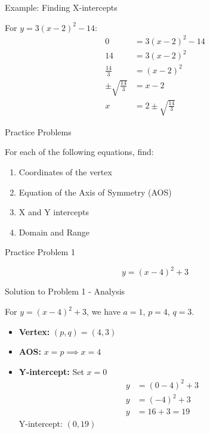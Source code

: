 \documentclass[aspectratio=169]{beamer}
\begin{document}
\begin{frame}{Example: Finding X-intercepts}
    \begin{tcolorbox}[colback=lightgray,colframe=primary,title=Example]
        \footnotesize
        For $y = 3(x-2)^2 - 14$:
        \begin{align*}
            0 &= 3(x-2)^2 - 14 \\
            14 &= 3(x-2)^2 \\
            \frac{14}{3} &= (x-2)^2 \\
            \pm\sqrt{\frac{14}{3}} &= x-2 \\
            x &= 2 \pm\sqrt{\frac{14}{3}}
        \end{align*}
    \end{tcolorbox}
\end{frame}

\begin{frame}{Practice Problems}
    \begin{tcolorbox}[colback=lightgray,colframe=primary,title=Problem Set]
        \footnotesize
        For each of the following equations, find:
        \begin{enumerate}
            \item Coordinates of the vertex
            \item Equation of the Axis of Symmetry (AOS)
            \item X and Y intercepts
            \item Domain and Range
        \end{enumerate}
    \end{tcolorbox}
\end{frame}

\begin{frame}{Practice Problem 1}
    \begin{tcolorbox}[colback=lightgray,colframe=primary,title=Problem 1]
        \footnotesize
        \[ y = (x-4)^2 + 3 \]
    \end{tcolorbox}
\end{frame}

\begin{frame}{Solution to Problem 1 - Analysis}
    \begin{tcolorbox}[colback=lightgray,colframe=accent,title=Solution 1]
        \footnotesize
        For $y = (x-4)^2 + 3$, we have $a=1$, $p=4$, $q=3$.
        \begin{itemize}
            \item \textbf{Vertex:} $(p,q) = (4,3)$
            \item \textbf{AOS:} $x = p \implies x = 4$
            \item \textbf{Y-intercept:} Set $x=0$
                \begin{align*}
                    y &= (0-4)^2 + 3 \\
                    y &= (-4)^2 + 3 \\
                    y &= 16 + 3 = 19
                \end{align*}
                Y-intercept: $(0,19)$
        \end{itemize}
    \end{tcolorbox}
\end{frame}
\end{document}
